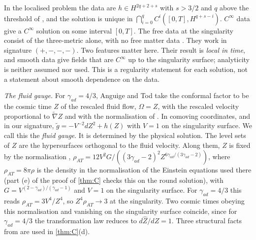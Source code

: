 \documentclass[11pt]{article}
\theoremstyle{canonmath}
\theoremstyle{canonpostulate}
\theoremstyle{canonproposition}
\theoremstyle{canonmath}
\theoremstyle{canonproposition}
\def\mathrm#1{#1}%
\begin{document}
In the localised problem the data are $h\in H^{2q+2+s}$ with $s>3/2$ and $q$ above the threshold of \cite[(107)]{AnguigeTod1999a}, and the solution is unique in $\bigcap_{i=0}^{q}C^i([0,T],H^{q+s-i})$. $C^\infty$ data give a $C^\infty$ solution on some interval $[0,T]$. The free data at the singularity consist of the three-metric alone, with no free matter data \cite{AnguigeTod1999a}.
They work in signature $(+,-,-,-)$. Two features matter here. Their result is \emph{local in time}, and smooth data give fields that are $C^\infty$ up to the singularity surface; analyticity is neither assumed nor used. This is a regularity statement for each solution, not a statement about smooth dependence on the data.

\emph{The fluid gauge.} For $\gamma_{\mathrm{ad}} = 4/3$, Anguige and Tod take the conformal factor to be the cosmic time $Z$ of the rescaled fluid flow, $\Omega = Z$, with the rescaled velocity proportional to $\tilde\nabla Z$ and with the normalisation of \cite[§4.2]{AnguigeTod1999a}. In comoving coordinates, and in our signature, $\tilde g = -V^{-2}dZ^2 + h(Z)$ with $V = 1$ on the singularity surface. We call this the \emph{fluid gauge}. It is determined by the physical solution. The level sets of $Z$ are the hypersurfaces orthogonal to the fluid velocity. Along them, $Z$ is fixed by the normalisation \cite[§4.2, (23)]{AnguigeTod1999a}, $\rho_{\mathrm{AT}} = 12V^2G/((3\gamma_{\mathrm{ad}}-2)^2Z^{6\gamma_{\mathrm{ad}}/(3\gamma_{\mathrm{ad}}-2)})$, where $\rho_{\mathrm{AT}} = 8\pi\rho$ is the density in the normalisation of the Einstein equations used there (part (e) of the proof of \cref{thm:C} checks this on the round solution), with $G = V^{(2-\gamma_{\mathrm{ad}})/(\gamma_{\mathrm{ad}}-1)}$ and $V = 1$ on the singularity surface. For $\gamma_{\mathrm{ad}} = 4/3$ this reads $\rho_{\mathrm{AT}} = 3V^4/Z^4$, so $Z^4\rho_{\mathrm{AT}}\to3$ at the singularity. Two cosmic times obeying this normalisation and vanishing on the singularity surface coincide, since for $\gamma_{\mathrm{ad}} = 4/3$ the transformation law \cite[(30)]{AnguigeTod1999a} reduces to $d\hat Z/dZ = 1$. Three structural facts from \cite[§4]{AnguigeTod1999a} are used in \cref{thm:C}(d).
\end{document}
